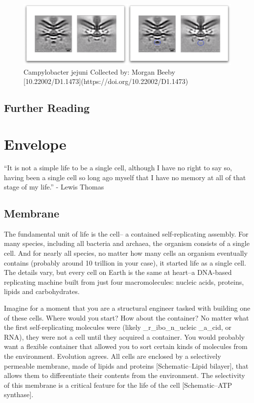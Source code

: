 \documentclass[]{tufte-book}
\begin{document}
\begin{figure}
\includegraphics{movie_stills/1_10a} \caption[Campylobacter jejuni Collected by]{Campylobacter jejuni Collected by: Morgan Beeby [10.22002/D1.1473](https://doi.org/10.22002/D1.1473)}\label{fig:unnamed-chunk-16}
\end{figure}

\section{Further Reading}\label{further-reading}

\citet{chalfie1994} \citet{jensen} \citet{oikonomou2017}
\citet{ruska1987}

\chapter{Envelope}\label{envelope}

``It is not a simple life to be a single cell, although I have no right
to say so, having been a single cell so long ago myself that I have no
memory at all of that stage of my life.'' - Lewis Thomas
\citet{thomas1990}

\section{Membrane}\label{membrane}

The fundamental unit of life is the cell-- a contained self-replicating
assembly. For many species, including all bacteria and archaea, the
organism consists of a single cell. And for nearly all species, no
matter how many cells an organism eventually contains (probably around
10 trillion in your case), it started life as a single cell. The details
vary, but every cell on Earth is the same at heart--a DNA-based
replicating machine built from just four macromolecules: nucleic acids,
proteins, lipids and carbohydrates.

Imagine for a moment that you are a structural engineer tasked with
building one of these cells. Where would you start? How about the
container? No matter what the first self-replicating molecules were
(likely \_r\_ibo\_n\_ucleic \_a\_cid, or RNA), they were not a cell
until they acquired a container. You would probably want a flexible
container that allowed you to sort certain kinds of molecules from the
environment. Evolution agrees. All cells are enclosed by a selectively
permeable membrane, made of lipids and proteins {[}Schematic--Lipid
bilayer{]}, that allows them to differentiate their contents from the
environment. The selectivity of this membrane is a critical feature for
the life of the cell {[}Schematic--ATP synthase{]}.
\end{document}
